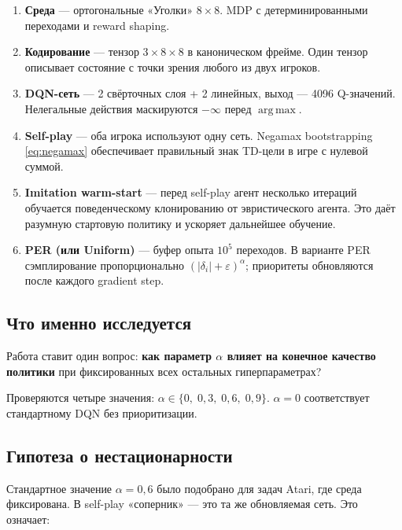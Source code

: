 \documentclass[a4paper, 11pt]{article}
\DeclareMathOperator*{\argmax}{arg\,max}
\begin{document}
\begin{enumerate}[itemsep=5pt]
  \item \textbf{Среда} — ортогональные «Уголки» $8 \times 8$. MDP
        с детерминированными переходами и reward shaping.

  \item \textbf{Кодирование} — тензор $3 \times 8 \times 8$ в
        каноническом фрейме. Один тензор описывает состояние с точки
        зрения любого из двух игроков.

  \item \textbf{DQN-сеть} — 2 свёрточных слоя + 2 линейных,
        выход — 4096 Q-значений. Нелегальные действия маскируются
        $-\infty$ перед $\argmax$.

  \item \textbf{Self-play} — оба игрока используют одну сеть.
        Negamax bootstrapping \eqref{eq:negamax} обеспечивает
        правильный знак TD-цели в игре с нулевой суммой.

  \item \textbf{Imitation warm-start} — перед self-play агент
        несколько итераций обучается поведенческому клонированию
        от эвристического агента. Это даёт разумную стартовую
        политику и ускоряет дальнейшее обучение.

  \item \textbf{PER (или Uniform)} — буфер опыта $10^5$ переходов.
        В варианте PER сэмплирование пропорционально $(|\delta_i| +
        \varepsilon)^\alpha$; приоритеты обновляются после каждого
        gradient step.
\end{enumerate}

\subsection{Что именно исследуется}

Работа ставит один вопрос: \textbf{как параметр $\alpha$ влияет на
конечное качество политики} при фиксированных всех остальных
гиперпараметрах?

Проверяются четыре значения: $\alpha \in \{0,\; 0{,}3,\; 0{,}6,\; 0{,}9\}$.
$\alpha = 0$ соответствует стандартному DQN без приоритизации.

\subsection{Гипотеза о нестационарности}

Стандартное значение $\alpha = 0{,}6$ было подобрано для задач Atari, где
среда фиксирована. В self-play «соперник» — это та же обновляемая сеть.
Это означает:
\end{document}
